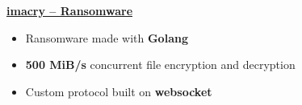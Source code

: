 \textbf{\href{https://github.com/prairir/imacry}{imacry -- Ransomware}} \par

\begin{itemize}
    \item Ransomware made with \textbf{Golang}
    \item \textbf{500 MiB/s} concurrent file encryption and decryption
    \item Custom protocol built on \textbf{websocket}
\end{itemize}
